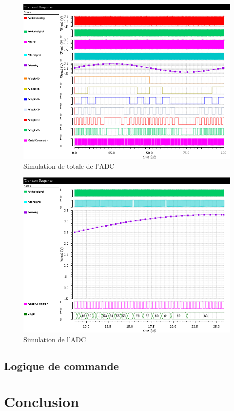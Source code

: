 \documentclass[a4paper]{article}
\begin{document}
\begin{figure}[!htb]
\begin{center}
  \includegraphics[width=0.7\linewidth]{Simulation-ADC-correct.png}
  \caption{Simulation de totale de l'ADC }
\end{center}
\end{figure}

\begin{figure}[!htb]
\begin{center}
  \includegraphics[width=0.7\linewidth]{Simulation-ADC-Bus-correct.png}
  \caption{Simulation de l'ADC}
\end{center}
\end{figure}


\clearpage
\subsection{Logique de commande}


\clearpage

\section{Conclusion}
\end{document}
